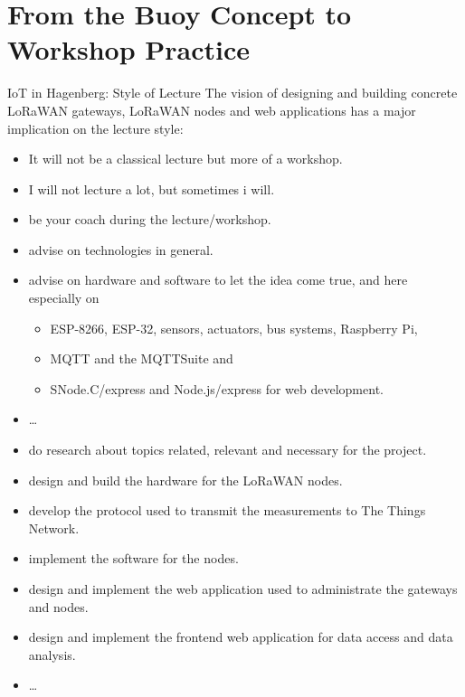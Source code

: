 \part[nopartpage]{From the Buoy Concept to Workshop Practice}

\begin{frame}{IoT in Hagenberg: \alert{Style of Lecture}}
The vision of designing and building concrete LoRaWAN gateways, LoRaWAN nodes and web applications has a major implication on the lecture style:
\begin{itemize}
    \item It will \alert{not be a classical lecture} but more of a \alert{workshop}.
    \item I will \alert{not lecture a lot}, but sometimes i will.
\end{itemize}
\begin{description}
    \item [I will]
    \begin{itemize}
        \item be \alert{your coach} during the lecture/workshop.
        \item advise on technologies in general.
        \item advise on hardware and software to let the idea come true, and here especially on
        \begin{itemize}
            \item ESP-8266, ESP-32, sensors, actuators, bus systems, Raspberry Pi,
            \item MQTT and the MQTTSuite and
            \item SNode.C/express and Node.js/express for web development.
        \end{itemize}
        \item \ldots
    \end{itemize}
    \item[You will]
    \begin{itemize}
        \item do \alert{research about topics} related, relevant and necessary \alert{for the project}.
        \item \alert{design and build the hardware} for the LoRaWAN nodes.
        \item \alert{develop the protocol} used to transmit the measurements to \alert{The Things Network}.
        \item \alert{implement the software} for the nodes.
        \item \alert{design and implement the web application} used to administrate the gateways and nodes.
        \item \alert{design and implement the frontend web application} for \alert{data access} and \alert{data analysis}.
        \item \ldots
    \end{itemize}
\end{description}
\end{frame}
